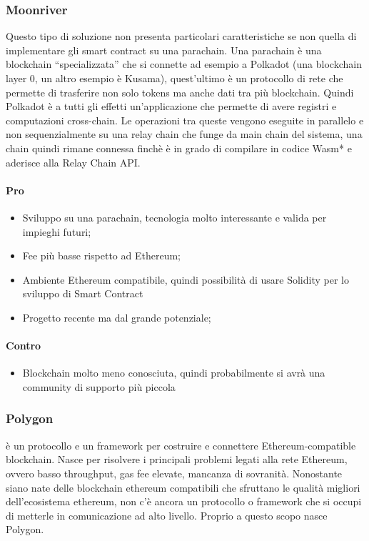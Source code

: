     \subsubsection{Moonriver}
    Questo tipo di soluzione non presenta particolari caratteristiche se non quella di implementare gli smart contract su una parachain. Una parachain è una blockchain “specializzata” che si connette ad esempio a Polkadot (una blockchain layer 0, un altro esempio è Kusama), quest’ultimo è un protocollo di rete che permette di trasferire non solo tokens ma anche dati tra più blockchain. Quindi Polkadot è a tutti gli effetti un’applicazione che permette di avere registri e computazioni cross-chain.
    Le operazioni tra queste vengono eseguite in parallelo e non sequenzialmente su una relay chain che funge da main chain del sistema, una chain quindi rimane connessa finchè è in grado di compilare in codice Wasm* e aderisce alla Relay Chain API.
    \paragraph{Pro}
    \begin{itemize}
        \item Sviluppo su una parachain, tecnologia molto interessante e valida per impieghi futuri;
        \item Fee più basse rispetto ad Ethereum;
        \item Ambiente Ethereum compatibile, quindi possibilità di usare Solidity per lo sviluppo di Smart Contract
        \item Progetto recente ma dal grande potenziale;
    \end{itemize}
    \paragraph{Contro}
    \begin{itemize}
        \item Blockchain molto meno conosciuta, quindi probabilmente si avrà una community di supporto più piccola
    \end{itemize}
    
    \subsubsection{Polygon}
    è un protocollo e un framework per costruire e connettere Ethereum-compatible blockchain. Nasce per risolvere i principali problemi legati alla rete Ethereum, ovvero basso throughput, gas fee elevate, mancanza di sovranità.
    Nonostante siano nate delle blockchain ethereum compatibili che sfruttano le qualità migliori dell’ecosistema ethereum, non c’è ancora un protocollo o framework che si occupi di metterle in comunicazione ad alto livello. Proprio a questo scopo nasce Polygon.

